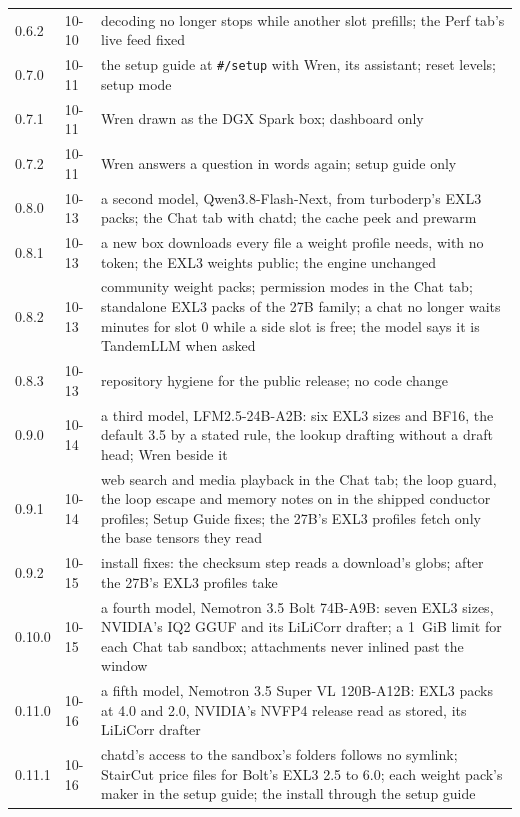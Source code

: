 \begin{table}[htbp]
\begin{tabularx}{\linewidth}{@{}L{.2\linewidth}L{.15\linewidth}Y@{}}
0.6.2 & 10-10 & decoding no longer stops while another slot prefills; the Perf tab's live feed fixed \\
0.7.0 & 10-11 & the setup guide at \texttt{\#/setup} with Wren, its assistant; reset levels; setup mode \\
0.7.1 & 10-11 & Wren drawn as the DGX Spark box; dashboard only \\
0.7.2 & 10-11 & Wren answers a question in words again; setup guide only \\
0.8.0 & 10-13 & a second model, Qwen3.8-Flash-Next, from turboderp's EXL3 packs; the Chat tab with chatd; the cache peek and prewarm \\
0.8.1 & 10-13 & a new box downloads every file a weight profile needs, with no token; the EXL3 weights public; the engine unchanged \\
0.8.2 & 10-13 & community weight packs; permission modes in the Chat tab; standalone EXL3 packs of the 27B family; a chat no longer waits minutes for slot 0 while a side slot is free; the model says it is TandemLLM when asked \\
0.8.3 & 10-13 & repository hygiene for the public release; no code change \\
0.9.0 & 10-14 & a third model, LFM2.5-24B-A2B: six EXL3 sizes and BF16, the default 3.5 by a stated rule, the lookup drafting without a draft head; Wren beside it \\
0.9.1 & 10-14 & web search and media playback in the Chat tab; the loop guard, the loop escape and memory notes on in the shipped conductor profiles; Setup Guide fixes; the 27B's EXL3 profiles fetch only the base tensors they read \\
0.9.2 & 10-15 & install fixes: the checksum step reads a download's globs; after  the 27B's EXL3 profiles take  \\
0.10.0 & 10-15 & a fourth model, Nemotron 3.5 Bolt 74B-A9B: seven EXL3 sizes, NVIDIA's IQ2 GGUF and its LiLiCorr drafter; a 1~GiB limit for each Chat tab sandbox; attachments never inlined past the window \\
0.11.0 & 10-16 & a fifth model, Nemotron 3.5 Super VL 120B-A12B: EXL3 packs at 4.0 and 2.0, NVIDIA's NVFP4 release read as stored, its LiLiCorr drafter \\
0.11.1 & 10-16 & chatd's access to the sandbox's folders follows no symlink; StairCut price files for Bolt's EXL3 2.5 to 6.0; each weight pack's maker in the setup guide; the install through the setup guide \\

\end{tabularx}
\end{table}
